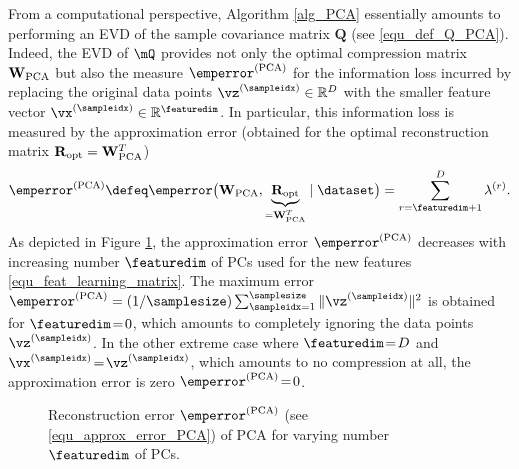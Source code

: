 \documentclass[12pt]{report}
\begin{document}
From a computational perspective, Algorithm \ref{alg_PCA} essentially amounts to performing an EVD of the sample covariance 
matrix $\mathbf{Q}$ (see \eqref{equ_def_Q_PCA}). Indeed, the EVD of $\mQ$ provides not only the optimal compression matrix 
$\mathbf{W}_{\rm PCA}$ but also the measure $\emperror^{(\rm PCA)}$ for the information loss incurred by replacing the original 
data points $\vz^{(\sampleidx)} \in \mathbb{R}^{D}$ with the smaller feature vector $\vx^{(\sampleidx)} \in \mathbb{R}^{\featuredim}$. 
In particular, this information loss is measured by the approximation error (obtained for the optimal reconstruction matrix 
$\mathbf{R}_{\rm opt} = \mathbf{W}_{\rm PCA}^{T}$)
\begin{equation} 
\label{equ_approx_error_PCA}
\emperror^{(\rm PCA)} \defeq \emperror \big( \mathbf{W}_{\rm PCA},\underbrace{\mathbf{R}_{\rm opt}}_{=\mathbf{W}_{\rm PCA}^{T}}\mid \dataset\big) = \sum_{r = \featuredim+1}^{D} \lambda^{(r)}. 
\end{equation} 
As depicted in Figure \ref{fig_ellbow_PCA}, the approximation error  $\emperror^{(\rm PCA)}$ decreases with increasing 
number $\featuredim$ of PCs used for the new features \eqref{equ_feat_learning_matrix}. The maximum error 
$\emperror^{(\rm PCA)} = (1/\samplesize) \sum_{\sampleidx=1}^{\samplesize} \| \vz^{(\sampleidx)} \|^{2}$ is obtained for 
$\featuredim\!=\!0$, which amounts to completely ignoring the data points $\vz^{(\sampleidx)}$. In the other extreme case 
where $\featuredim\!=\!D$ and $\vx^{(\sampleidx)}\!=\!\vz^{(\sampleidx)}$, which amounts to no compression at all, the 
approximation error is zero $\emperror^{(\rm PCA)}\!=\!0$. 

\begin{figure}[htbp]
\begin{center}
\end{center}
\caption{Reconstruction error $\emperror^{(\rm PCA)}$ (see \eqref{equ_approx_error_PCA}) of PCA for varying number $\featuredim$ of PCs.}
\label{fig_ellbow_PCA}
\end{figure}
\end{document}
